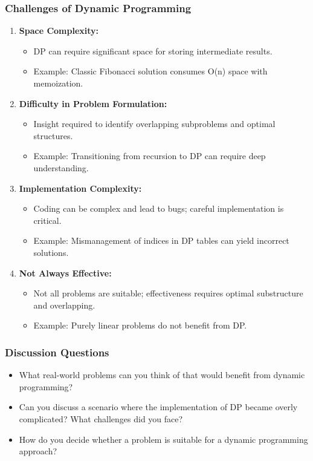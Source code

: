 \documentclass[aspectratio=169]{beamer}
\begin{document}
\begin{frame}[fragile]
    \frametitle{Challenges of Dynamic Programming}
    \begin{enumerate}
        \item \textbf{Space Complexity:}
            \begin{itemize}
                \item DP can require significant space for storing intermediate results.
                \item Example: Classic Fibonacci solution consumes O(n) space with memoization.
            \end{itemize}

        \item \textbf{Difficulty in Problem Formulation:}
            \begin{itemize}
                \item Insight required to identify overlapping subproblems and optimal structures.
                \item Example: Transitioning from recursion to DP can require deep understanding.
            \end{itemize}

        \item \textbf{Implementation Complexity:}
            \begin{itemize}
                \item Coding can be complex and lead to bugs; careful implementation is critical.
                \item Example: Mismanagement of indices in DP tables can yield incorrect solutions.
            \end{itemize}

        \item \textbf{Not Always Effective:}
            \begin{itemize}
                \item Not all problems are suitable; effectiveness requires optimal substructure and overlapping.
                \item Example: Purely linear problems do not benefit from DP.
            \end{itemize}
    \end{enumerate}
\end{frame}

\begin{frame}[fragile]
    \frametitle{Discussion Questions}
    \begin{itemize}
        \item What real-world problems can you think of that would benefit from dynamic programming?
        \item Can you discuss a scenario where the implementation of DP became overly complicated? What challenges did you face?
        \item How do you decide whether a problem is suitable for a dynamic programming approach?
    \end{itemize}
\end{frame}
\end{document}
